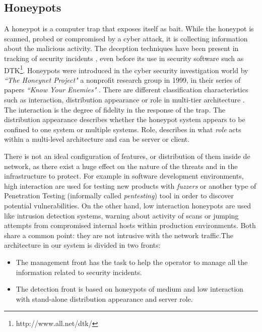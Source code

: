 \documentclass[a4paper]{llncs}
\begin{document}
\subsection{Honeypots}
A honeypot is a computer trap that exposes itself as bait. While the
honeypot is scanned, probed or compromised by a cyber attack, it is
collecting information about the malicious activity. The deception
techniques have been present in tracking of security incidents
\cite{Cheswick92anevening,RoleOfDeception}, even before its use in
security software such as
DTK\footnote{http://www.all.net/dtk/}. Honeypots were introduced in
the cyber security investigation world by {\it``The Honeynet Project"}
a nonprofit research group in 1999, in their series of papers
{\it``Know Your Enemies"} \cite{KnowYourEnemies}. There are different
classification characteristics such as interaction, distribution
appearance or role in multi-tier architecture
\cite{Seifert06taxonomyof}. The interaction is the degree of fidelity
in the response of the trap. The distribution appearance describes
whether the honeypot system appears to be confined to one system or
multiple systems. Role, describes in what {\it role} acts within a
multi-level architecture and can be server or client. 

There is not an ideal configuration of features, or distribution of them inside de network, as there exist a huge effect on the nature of the threats and in the infrastructure to protect. For example in software development environments, high interaction are used for testing new products with {\it fuzzers} or another type of Penetration Testing (informally called {\it pentesting}) tool \cite{fuzzingforsec} in order to discover potential vulnerabilities. On the other hand, low interaction honeypots are used like intrusion detection systems, warning about activity of scans or jumping attempts from compromised internal hosts within production environments. Both share a common point: they are not intrusive with the network traffic.The architecture in our system is divided in two fronts:
\begin{itemize}
	\item The management front has the task to help the operator to manage all the information related to security incidents.
	\item The detection front is based on honeypots of medium and low interaction with stand-alone distribution appearance and server role.
\end{itemize}
\end{document}
